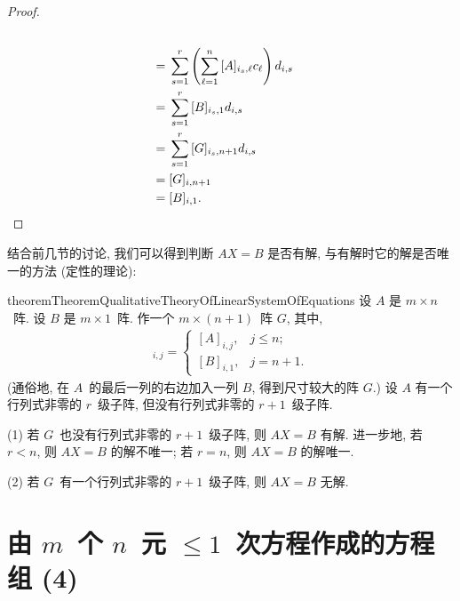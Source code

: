 \documentclass[../libro.tex]{subfiles}
\begin{document}
\begin{proof}
\begin{align*}
{        }
        \\
        = {} &
        \sum_{s = 1}^{r}
        {
            \left(\sum_{\ell = 1}^{n}
                {
                    [A]_{i_s,\ell} c_\ell
            }\right)
            d_{i,s}
        }
        \\
        = {} &
        \sum_{s = 1}^{r}
        {[B]_{i_s,1} d_{i,s}}
        \\
        = {} &
        \sum_{s = 1}^{r}
        {[G]_{i_s,n+1} d_{i,s}}
        \\
        = {} &
        [G]_{i,n+1}
        \\
        = {} &
        [B]_{i,1}.
        \qedhere
    \end{align*}
\end{proof}

结合前几节的讨论, 我们可以得到判断
\(AX = B\) 是否有解,
与有解时它的解是否唯一的方法
(定性的理论):

\begin{restatable}{theorem}{TheoremQualitativeTheoryOfLinearSystemOfEquations}
    设 \(A\) 是 \(m \times n\)~阵.
    设 \(B\) 是 \(m \times 1\)~阵.
    作一个 \(m \times (n+1)\)~阵 \(G\),
    其中,
    \begin{align*}
        [G]_{i,j} =
        \begin{cases}
            [A]_{i,j}, & j \leq n;  \\
            [B]_{i,1}, & j = n + 1.
        \end{cases}
    \end{align*}
    (通俗地, 在 \(A\)~的最后一列的右边加入一列 \(B\),
    得到尺寸较大的阵 \(G\).)
    设
    \(A\) 有一个行列式非零的 \(r\)~级子阵,
    但没有行列式非零的 \(r+1\)~级子阵.

    (1)
    若 \(G\)~也没有行列式非零的 \(r+1\)~级子阵,
    则 \(AX = B\) 有解.
    进一步地, 若 \(r < n\),
    则 \(AX = B\) 的解不唯一;
    若 \(r = n\),
    则 \(AX = B\) 的解唯一.

    (2)
    若 \(G\)~有一个行列式非零的 \(r+1\)~级子阵,
    则 \(AX = B\) 无解.
\end{restatable}

\KunAsteriskoEnEnhavtabelo
\section{\texorpdfstring{由 \(m\)~个 \(n\)~元
    \({\leq} 1\)~次方程作成的方程组 (4)}%
{由 m 个 n 元 ≤1 次方程作成的方程组 (4)}}
\SenAsteriskoEnEnhavtabelo
\end{document}
